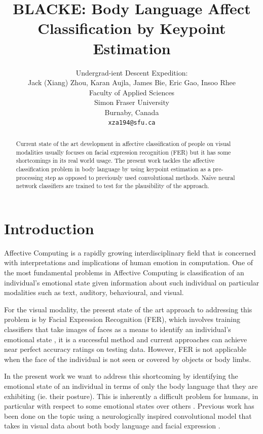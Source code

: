 \documentclass{article}
\title{BLACKE: Body Language Affect Classification by Keypoint Estimation}
\author{
  Undergrad-ient Descent Expedition: \\
  Jack (Xiang) Zhou, Karan Aujla, James Bie, Eric Gao, Insoo Rhee\\
  Faculty of Applied Sciences\\
  Simon Fraser University\\
  Burnaby, Canada\\
  \texttt{xza194@sfu.ca} \\
}
\begin{document}
\maketitle

\begin{abstract}
Current state of the art development in affective classification of people on visual modalities usually focuses on facial expression recognition (FER) but it has some shortcomings in its real world usage. The present work tackles the affective classification problem in body language by using keypoint estimation as a pre-processing step as opposed to previously used convolutional methods. Na\"ive neural network classifiers are trained to test for the plausibility of the approach.
\end{abstract}

\section{Introduction}

Affective Computing is a rapidly growing interdisciplinary field that is concerned with interpretations and implications of human emotion in computation. One of the most fundamental problems in Affective Computing is classification of an individual's emotional state given information about such individual on particular modalities such as text, auditory, behavioural, and visual.

For the visual modality, the present state of the art approach to addressing this problem is by Facial Expression Recognition (FER), which involves training classifiers that take images of faces as a means to identify an individual's emotional state \citep{li2018deep}, it is a successful method and current approaches can achieve near perfect accuracy ratings on testing data. However, FER is not applicable when the face of the individual is not seen or covered by objects or body limbs. 

In the present work we want to address this shortcoming by identifying the emotional state of an individual in terms of only the body language that they are exhibiting (ie. their posture). This is inherently a difficult problem for humans, in particular with respect to some emotional states over others \citep{schindler2008recognizing}. Previous work has been done on the topic using a neurologically inspired convolutional model that takes in visual data about both body language and facial expression \citep{schindler2008recognizing}.
\end{document}
